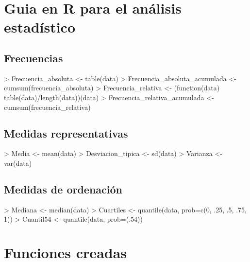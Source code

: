 \documentclass [a4paper] {article}
\begin{document}
\begin{center}
\section{Guia en R para el análisis estadístico}
\subsection{Frecuencias}
\begin{Schunk}
\begin{Sinput}
> Frecuencia_absoluta <- table(data)
> Frecuencia_absoluta_acumulada <- cumsum(frecuencia_absoluta)
> Frecuencia_relativa <- (function(data) table(data)/length(data))(data)
> Frecuencia_relativa_acumulada <- cumsum(frecuencia_relativa)
\end{Sinput}
\end{Schunk}
\subsection{Medidas representativas}
\begin{Schunk}
\begin{Sinput}
> Media <- mean(data)
> Desviacion_tipica <- sd(data)
> Varianza <- var(data)
\end{Sinput}
\end{Schunk}
\subsection{Medidas de ordenación}
\begin{Schunk}
\begin{Sinput}
> Mediana <- median(data)
> Cuartiles <- quantile(data, prob=c(0, .25, .5, .75, 1))
> Cuantil54 <- quantile(data, prob=(.54))
\end{Sinput}
\end{Schunk}

\section{Funciones creadas}

\end{center}
\end{document}
